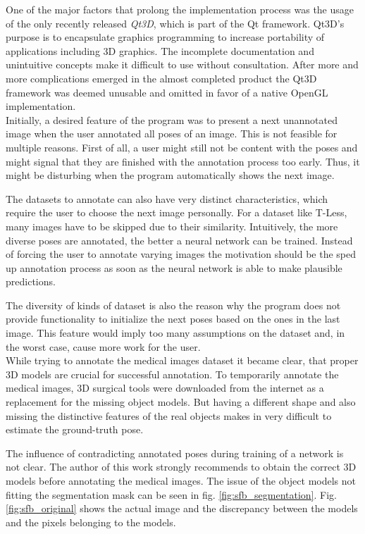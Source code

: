 One of the major factors that prolong the implementation process was the usage of the only recently released \textit{Qt3D}, which is part of the Qt framework. Qt3D's purpose is to encapsulate graphics programming to increase portability of applications including 3D graphics. The incomplete documentation and unintuitive concepts make it difficult to use without consultation. After more and more complications emerged in the almost completed product the Qt3D framework was deemed unusable and omitted in favor of a native OpenGL implementation. \\

Initially, a desired feature of the program was to present a next unannotated image when the user annotated all poses of an image. This is not feasible for multiple reasons. First of all, a user might still not be content with the poses and might signal that they are finished with the annotation process too early. Thus, it might be disturbing when the program automatically shows the next image. 

The datasets to annotate can also have very distinct characteristics, which require the user to choose the next image personally. For a dataset like T-Less, many images have to be skipped due to their similarity. Intuitively, the more diverse poses are annotated, the better a neural network can be trained. Instead of forcing the user to annotate varying images the motivation should be the sped up annotation process as soon as the neural network is able to make plausible predictions. 

The diversity of kinds of dataset is also the reason why the program does not provide functionality to initialize the next poses based on the ones in the last image. This feature would imply too many assumptions on the dataset and, in the worst case, cause more work for the user. \\

While trying to annotate the medical images dataset it became clear, that proper 3D models are crucial for successful annotation. To temporarily annotate the medical images, 3D surgical tools were downloaded from the internet as a replacement for the missing object models. But having a different shape and also missing the distinctive features of the real objects makes in very difficult to estimate the ground-truth pose. 

The influence of contradicting annotated poses during training of a network is not clear. The author of this work strongly recommends to obtain the correct 3D models before annotating the medical images. The issue of the object models not fitting the segmentation mask can be seen in fig. \ref{fig:sfb_segmentation}. Fig. \ref{fig:sfb_original} shows the actual image and the discrepancy between the models and the pixels belonging to the models. \\

